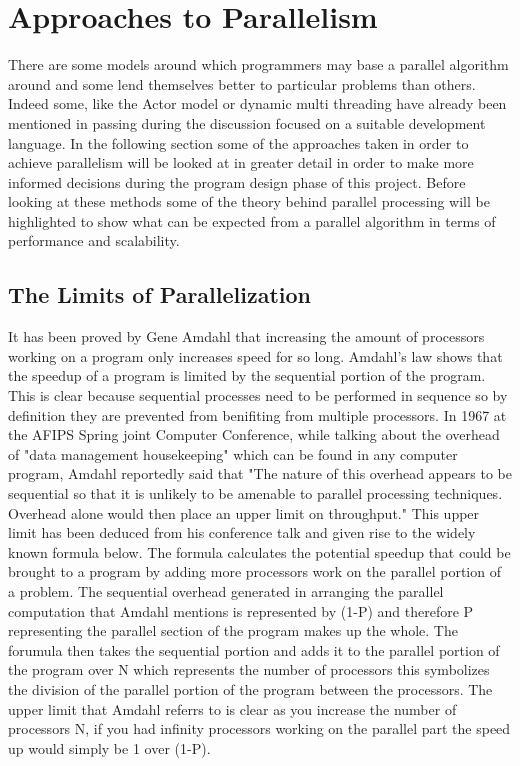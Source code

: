 \documentclass[main.tex]{subfiles}
\begin{document}
{{\section{Approaches to Parallelism}

There are some models around which programmers may base a parallel algorithm around and some lend themselves better to particular problems than others. Indeed some, like the Actor model or dynamic multi threading have already been mentioned in passing during the discussion focused on a suitable development language. In the following section some of the approaches taken in order to achieve parallelism will be looked at in greater detail in order to make more informed decisions during the program design phase of this project. Before looking at these methods some of the theory behind parallel processing will be highlighted to show what can be expected from a parallel algorithm in terms of performance and scalability.

\subsection{The Limits of Parallelization}
It has been proved by Gene Amdahl that increasing the amount of processors working on a program only increases speed for so long. Amdahl's law shows that the speedup of a program is limited by the sequential portion of the program. This is clear because sequential processes need to be performed in sequence so by definition they are prevented from benifiting from multiple processors. In 1967 at the AFIPS Spring joint Computer Conference, while talking about the overhead of "data management housekeeping" which can be found in any computer program, Amdahl reportedly said that "The nature of this overhead appears to be sequential so that it is unlikely to be amenable to parallel processing techniques. Overhead alone would then place an upper limit on throughput."\cite{Amdahl1967} This upper limit has been deduced from his conference talk and given rise to the widely known formula below.
The formula calculates the potential speedup that could be brought to a program by adding more processors work on the parallel portion of a problem. The sequential overhead generated in arranging the parallel computation that Amdahl mentions is represented by (1-P) and therefore P representing the parallel section of the program makes up the whole. The forumula then takes the sequential portion and adds it to the parallel portion of the program over N which represents the number of processors this symbolizes the division of the parallel portion of the program between the processors. The upper limit that Amdahl referrs to is clear as you increase the number of processors N, if you had infinity processors working on the parallel part the speed up would simply be 1 over (1-P).
\cite{Amdahl1967}

}}
\end{document}
